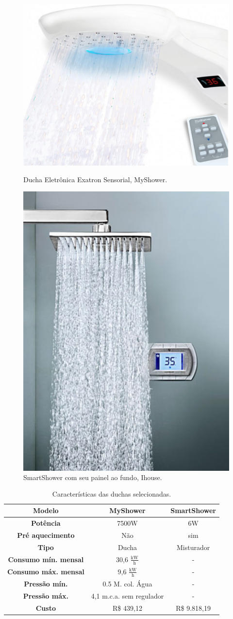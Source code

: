\begin{figure}[H]
\centering
\begin{minipage}{.45\textwidth}
	\centering
	\includegraphics[width=.7\linewidth,keepaspectratio,angle=0]{figuras/MyShower.eps}
	\caption{Ducha Eletrônica Exatron Sensorial, MyShower.}
\end{minipage}\hfill
\begin{minipage}{.45\textwidth}
	\centering
	\includegraphics[width=.5\linewidth,keepaspectratio,angle=0]{figuras/Ihouse.eps}
	\caption{SmartShower com seu painel ao fundo, Ihouse.}
\end{minipage}
\end{figure}

\begin{table}[H]
\centering
\begin{tabular}{|c|c|c|}
\hline 
\textbf{Modelo} & \textbf{MyShower} & \textbf{SmartShower}\tabularnewline
\hline 
\hline 
\textbf{Potência} & 7500$\si{\watt}$ & 6$\si{\watt}$\tabularnewline
\hline 
\textbf{Pré aquecimento} & Não & sim\tabularnewline
\hline 
\textbf{Tipo} & Ducha & Misturador\tabularnewline
\hline 
\textbf{Consumo mín. mensal} & 30,6 $\tfrac{\si{\kilo\watt}}{\si{\hour}}$ & -\tabularnewline
\hline 
\textbf{Consumo máx. mensal} & 9,6 $\tfrac{\si{\kilo\watt}}{\si{\hour}}$ & -\tabularnewline
\hline 
\textbf{Pressão mín.} & 0.5 M. col. Água & -\tabularnewline
\hline 
\textbf{Pressão máx.} & 4,1 m.c.a. sem regulador & -\tabularnewline
\hline 
\textbf{Custo} & R\$ 439,12 & R\$ 9.818,19\tabularnewline
\hline 
\end{tabular}
\caption{Características das duchas selecionadas.}
\end{table}


